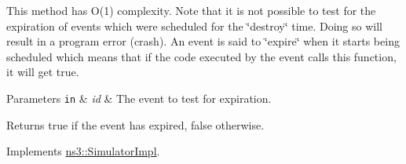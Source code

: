 This method has O(1) complexity. Note that it is not possible to test for the expiration of events which were scheduled for the \char`\"{}destroy\char`\"{} time. Doing so will result in a program error (crash). An event is said to \char`\"{}expire\char`\"{} when it starts being scheduled which means that if the code executed by the event calls this function, it will get true.


\begin{DoxyParams}[1]{Parameters}
\mbox{\tt in}  & {\em id} & The event to test for expiration. \\
\hline
\end{DoxyParams}
\begin{DoxyReturn}{Returns}
{\ttfamily true} if the event has expired, false otherwise. 
\end{DoxyReturn}


Implements \hyperlink{classns3_1_1SimulatorImpl_a4b01ac397f5ce86997e9caec087f63d2}{ns3\+::\+Simulator\+Impl}.


